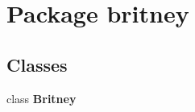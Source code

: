 \section{Package britney}
\label{namespacebritney}


\subsection*{Classes}
\begin{CompactItemize}
\item 
class \bf{Britney}
\end{CompactItemize}
